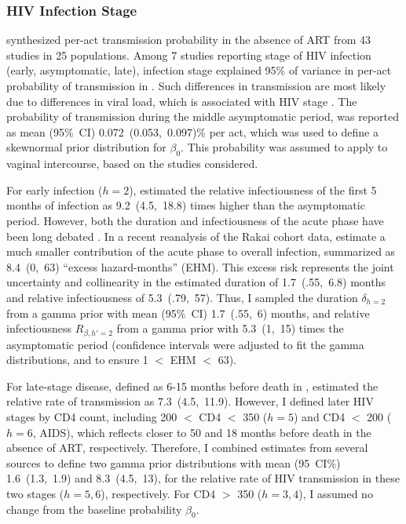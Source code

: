 \subsubsection{HIV Infection Stage}\label{model.par.beta.hiv}
\citet{Boily2009} synthesized per-act transmission probability in the absence of ART
from 43 studies in 25 populations.
Among 7 studies reporting stage of HIV infection (early, asymptomatic, late),
infection stage explained 95\% of variance
in per-act probability of transmission in \cite{Boily2009}.
Such differences in transmission are most likely due to differences in viral load,
which is associated with HIV stage \cite{Saag1996,Donnell2010}.
The probability of transmission during the middle asymptomatic period,
was reported as mean (95\%~CI) 0.072~(0.053,~0.097)\% per act,
which was used to define a skewnormal prior distribution for $\beta_0$.
This probability was assumed to apply to vaginal intercourse,
based on the studies considered.
\par
For early infection ($h=2$), \citet{Boily2009} estimated
the relative infectiousness of the first 5 months of infection
as 9.2~(4.5,~18.8) times higher than the asymptomatic period.
However, both the duration and infectiousness of the acute phase
have been long debated \cite{Hollingsworth2008,Cohen2011,Cohen2012}.
In a recent reanalysis of the Rakai cohort data, \citet{Bellan2015} estimate
a much smaller contribution of the acute phase to overall infection,
summarized as 8.4~(0,~63) ``excess hazard-months'' (EHM).
This excess risk represents the joint uncertainty and collinearity in the estimated
duration of 1.7~(.55,~6.8) months and relative infectiousness of 5.3~(.79,~57).
Thus, I sampled the duration $\delta_{h=2}$ from
a gamma prior with mean (95\%~CI) 1.7~(.55,~6) months,
and relative infectiousness $R_{\beta,h'=2}$ from
a gamma prior with 5.3~(1,~15) times the asymptomatic period
(confidence intervals were adjusted to fit the gamma distributions, and to ensure 1 $<$ EHM $<$ 63).
\par
For late-stage disease, defined as 6-15 months before death in \cite{Boily2009},
\citeauthor{Boily2009} estimated the relative rate of transmission as 7.3~(4.5,~11.9).
However, I defined later HIV stages by CD4 count, including
200 $<$ CD4 $<$ 350 ($h=5$) and CD4 $<$ 200 ($h=6$, AIDS),
which reflects closer to 50 and 18 months before death in the absence of ART, respectively.
Therefore, I combined estimates from several sources
\cite{Wawer2005,Boily2009,Donnell2010} to define two gamma prior distributions
with mean (95~CI\%) 1.6~(1.3,~1.9) and 8.3~(4.5,~13),
for the relative rate of HIV transmission in these two stages ($h=5,6$), respectively.
For CD4 $>$ 350 ($h=3,4$), I assumed no change from the baseline probability $\beta_0$.
